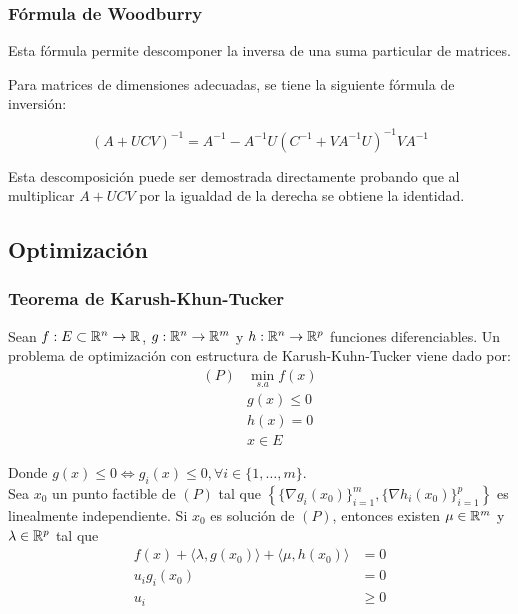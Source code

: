 \subsubsection{Fórmula de Woodburry}

Esta fórmula permite descomponer la inversa de una suma particular de matrices.

\begin{theorem}
	Para matrices de dimensiones adecuadas, se tiene la siguiente fórmula de inversión:
	
	\begin{equation*}
		(A+UCV)^{-1} = A^{-1} - A^{-1}U(C^{-1}+VA^{-1}U)^{-1}VA^{-1}
	\end{equation*}
\end{theorem}

Esta descomposición puede ser demostrada directamente probando que al multiplicar $A+UCV$ por la igualdad de la derecha se obtiene la identidad.


\subsection{Optimización}
\subsubsection{Teorema de Karush-Khun-Tucker}

Sean $f:E\subset\mathbb{R}^n\to\mathbb{R}$, $g:\mathbb{R}^n \to \mathbb{R}^m$ y $h:\mathbb{R}^n \to \mathbb{R}^p$ funciones diferenciables. Un problema de optimización con estructura de Karush-Kuhn-Tucker viene dado por:
	\begin{align*}
		(P) & \min_{s.a} f(x)\\
		& g(x) \leq 0\\
		& h(x) = 0\\
		& x\in E
	\end{align*}

Donde $g(x) \leq 0\iff g_i(x)\leq 0,\forall i\in\{1,\ldots,m\}$.\\

Sea $x_0$ un punto factible de $(P)$ tal que $\left\{\{\nabla g_i(x_0)\}_{i=1}^m,\{\nabla h_i(x_0)\}_{i=1}^p\right\}$ es linealmente independiente. Si $x_0$ es solución de $(P)$, entonces existen $\mu\in\mathbb{R}^m$ y $\lambda\in\mathbb{R}^p$ tal que
\begin{align*}
		f(x) + \langle\lambda,g(x_0)\rangle + \langle\mu,h(x_0)\rangle &=0\\
		 u_i g_i(x_0) &= 0\\
		 u_i &\geq 0\\
	\end{align*}



